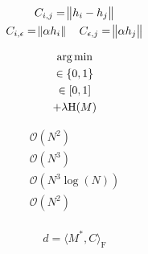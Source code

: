 \begin{equation}
    \begin{gathered}
         C_{i,j} = \norm{h_i - h_j} \\
         C_{i, \epsilon} = \norm{ \alpha h_i} \quad
         C_{\epsilon, j} = \norm{ \alpha h_j} \\
    \end{gathered}
\end{equation}

\begin{equation}
    \begin{gathered}
         \operatorname*{arg\,min} \\
         \in \{0,1\} \\
         \in [0,1] \\
         + \lambda\text{H}(M)
    \end{gathered}
\end{equation}

\begin{equation}
    \begin{gathered}
        \mathcal{O}(N^2) \\
        \mathcal{O}(N^3) \\
        \mathcal{O}(N^3 \log(N)) \\
        \mathcal{O}(N^2) \\
    \end{gathered}
\end{equation}



\begin{equation}
    d = \langle M^*, C \rangle_\mathrm{F}
\end{equation}







